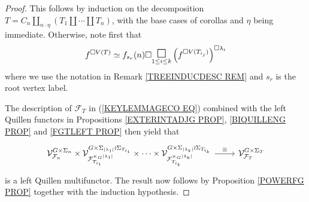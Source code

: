 \documentclass[a4paper,10pt]{article}%
\begin{document}
\begin{proof}
	This follows by induction on the decomposition 
	$T= C_n \amalg_{n \cdot \eta}(T_1 \amalg \cdots \amalg T_n)$, 
	with the base cases of corollas and $\eta$ being immediate. Otherwise, note first that
\[
f^{\square V(T)}
\simeq
f_{s_r}(n) \square
	\underset{1\leq i \leq k}{\mathlarger{\mathlarger{\square}}}
	\left(f^{\square V(T_{i_j})}\right)^{\square \lambda_i}
\]
where we use the notation in
Remark \ref{TREEINDUCDESC REM} and $s_r$ is the root vertex label.

	The description of $\mathcal{F}_T$ in (\ref{KEYLEMMAGECO EQ}) combined with the left Quillen functors in 
	Propositions \ref{EXTERINTADJG PROP}, \ref{BIQUILLENG PROP} and \ref{FGTLEFT PROP} then yield that 
\[
\begin{tikzcd}
	\mathcal{V}^{G \times \Sigma_n}_{\mathcal{F}_n}	
		\times
	\mathcal{V}
	^{G \times \Sigma_{|\lambda_1|}\wr \Sigma_{T_{i_1}}}
	_{\mathcal{F}_{T_{i_1}}^{\ltimes_G |\lambda_1|}}
		\times \cdots \times
	\mathcal{V}
	^{G \times \Sigma_{|\lambda_k|}\wr \Sigma_{T_{i_k}}}
	_{\mathcal{F}_{T_{i_k}}^{\ltimes_G |\lambda_k|}}
\ar{r}{\otimes}
&
	\mathcal{V}^{G \times \Sigma_T}_{\mathcal{F}_T}
\end{tikzcd}
\]
is a left Quillen multifunctor.
The result now follows by Proposition \ref{POWERFG PROP} together with the induction hypothesis.
\end{proof}
\end{document}
